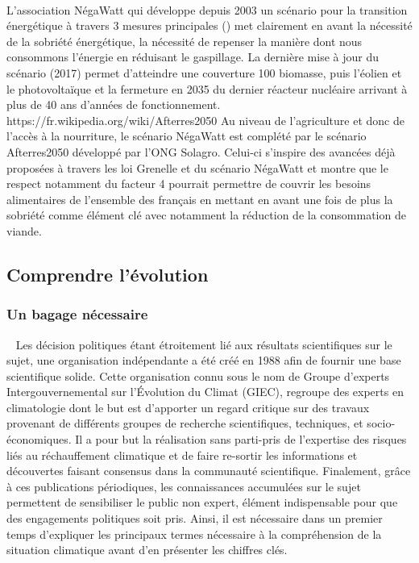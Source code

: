 ~\\ 
L’association NégaWatt qui développe depuis 2003 un scénario pour la transition énergétique
à travers 3 mesures principales () met clairement
en avant la nécessité de la sobriété énergétique, la nécessité de repenser la manière
dont nous consommons l’énergie en réduisant le gaspillage. La dernière mise à jour
du scénario (2017) permet d’atteindre une couverture 100%
biomasse, puis l’éolien et le photovoltaïque et la fermeture en 2035 du dernier
réacteur nucléaire arrivant à plus de 40 ans d’années de fonctionnement.
https://fr.wikipedia.org/wiki/Afterres2050
Au niveau de l’agriculture et donc de l’accès à la nourriture, le scénario NégaWatt
est complété par le scénario Afterres2050 développé par l’ONG Solagro. Celui-ci s’inspire
des avancées déjà proposées à travers les loi Grenelle et du scénario NégaWatt et montre
que le respect notamment du facteur 4 pourrait permettre de couvrir les besoins
alimentaires de l’ensemble des français en mettant en avant une fois de plus la
sobriété comme élément clé avec notamment la réduction de la consommation de viande.





\subsection{Comprendre l’évolution} %
\label{sub:comprendre_l_evolution}

\subsubsection{Un bagage nécessaire} %
\label{ssub:un_bagage_necessaire}
~
Les décision politiques étant étroitement lié aux résultats scientifiques sur le
sujet, une organisation indépendante a été créé en 1988 afin de fournir une base
scientifique solide. Cette organisation connu sous le nom de
Groupe d'experts Intergouvernemental sur l'Évolution du Climat (GIEC), regroupe
des experts en climatologie dont le but est d’apporter un regard critique sur
des travaux provenant de différents groupes de recherche scientifiques, techniques,
et socio-économiques. Il a pour but la réalisation sans parti-pris de l’expertise
des risques liés au réchauffement climatique et de faire re-sortir les informations
et découvertes faisant consensus dans la communauté scientifique. Finalement, grâce à ces
publications périodiques, les connaissances accumulées sur le sujet permettent de
sensibiliser le public non expert, élément indispensable pour que des engagements
politiques soit pris. Ainsi, il est nécessaire dans un premier temps d’expliquer les principaux termes
nécessaire à la compréhension de la situation climatique avant d’en présenter les chiffres
clés.

